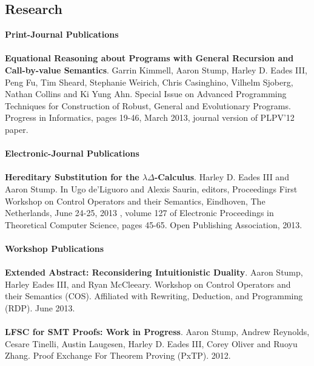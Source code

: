 \documentclass[line,margin]{res}
\begin{document}
\begin{resume}
                  
 \section{\small Research}
                  \textbf{\large{Print-Journal Publications}}\\
                  \ \\
                  \textbf{Equational Reasoning about Programs with General Recursion and Call-by-value Semantics}.
                  Garrin Kimmell, Aaron Stump, Harley D. Eades III, Peng Fu, Tim Sheard, Stephanie Weirich, 
                  Chris Casinghino, Vilhelm Sjoberg, Nathan Collins and Ki Yung Ahn. 
                  Special Issue on Advanced Programming Techniques for Construction of Robust, General and Evolutionary 
                  Programs. Progress in Informatics, pages 19-46, March 2013, journal version of PLPV’12 paper. \\
                  \ \\
                  \textbf{\large{Electronic-Journal Publications}}\\
                  \ \\
                  \textbf{Hereditary Substitution for the $\lambda\Delta$-Calculus}. 
                  Harley D. Eades III and Aaron Stump. 
                  In Ugo de'Liguoro and Alexis
                  Saurin, editors, Proceedings First Workshop on Control Operators and
                  their Semantics, Eindhoven, The Netherlands, June 24-25, 2013 ,
                  volume 127 of Electronic Proceedings in Theoretical Computer
                  Science, pages 45-65. Open Publishing Association, 2013.\\
                  \ \\
                  \textbf{\large{Workshop Publications}}\\
                  \ \\                  
                  \textbf{Extended Abstract: Reconsidering Intuitionistic Duality}.
                  Aaron Stump, Harley Eades III, and Ryan McCleeary. Workshop on Control Operators and their Semantics (COS).
                  Affiliated with Rewriting, Deduction, and Programming (RDP). June 2013.\\
                  \ \\
                  \textbf{LFSC for SMT Proofs: Work in Progress}.
                  Aaron Stump, Andrew Reynolds, Cesare Tinelli, Austin Laugesen, Harley D. Eades III, Corey Oliver and Ruoyu Zhang. 
                  Proof Exchange For Theorem Proving (PxTP). 2012.\\

\end{resume}
\end{document}
